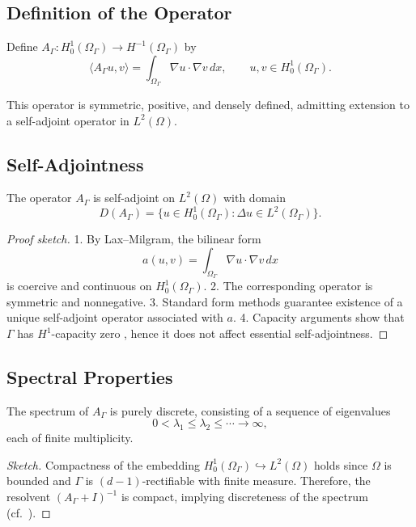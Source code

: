 \subsection*{Definition of the Operator}
\begin{definition}
Define $A_\Gamma : H^1_0(\Omega_\Gamma) \to H^{-1}(\Omega_\Gamma)$ by
\[
\langle A_\Gamma u, v \rangle
= \int_{\Omega_\Gamma} \nabla u \cdot \nabla v \, dx,
\qquad
u,v \in H^1_0(\Omega_\Gamma).
\]
\end{definition}

This operator is symmetric, positive, and densely defined, admitting
extension to a self-adjoint operator in $L^2(\Omega)$.

\subsection*{Self-Adjointness}
\begin{proposition}
The operator $A_\Gamma$ is self-adjoint on $L^2(\Omega)$ with domain
\[
D(A_\Gamma) = \big\{ u \in H^1_0(\Omega_\Gamma) :
\Delta u \in L^2(\Omega_\Gamma) \big\}.
\]
\end{proposition}

\begin{proof}[Proof sketch]
1. By Lax–Milgram, the bilinear form
\[
a(u,v) = \int_{\Omega_\Gamma} \nabla u \cdot \nabla v \, dx
\]
is coercive and continuous on $H^1_0(\Omega_\Gamma)$.
2. The corresponding operator is symmetric and nonnegative.
3. Standard form methods \cite{Kato1995} guarantee existence of a unique
self-adjoint operator associated with $a$.
4. Capacity arguments show that $\Gamma$ has $H^1$-capacity zero
\cite{MazyaPlamenevskii1980}, hence it does not affect essential
self-adjointness.
\end{proof}

\subsection*{Spectral Properties}
\begin{theorem}
The spectrum of $A_\Gamma$ is purely discrete, consisting of a sequence of
eigenvalues
\[
0 < \lambda_1 \leq \lambda_2 \leq \cdots \to \infty,
\]
each of finite multiplicity.
\end{theorem}

\begin{proof}[Sketch]
Compactness of the embedding $H^1_0(\Omega_\Gamma)\hookrightarrow L^2(\Omega)$
holds since $\Omega$ is bounded and $\Gamma$ is $(d-1)$-rectifiable with
finite measure. Therefore, the resolvent $(A_\Gamma+I)^{-1}$ is compact,
implying discreteness of the spectrum (cf.~\cite{Rellich1969}).
\end{proof}

